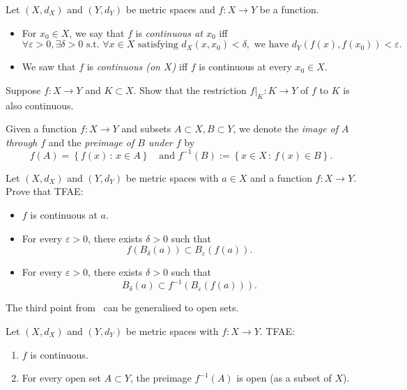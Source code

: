 \begin{defn}
\label{defn:cty}
Let $(X,d_X)$ and $(Y,d_Y)$ be metric spaces and $f:X\to Y$ be a function.
\begin{itemize}
	\item For $x_0\in X$, we say that $f$ is \textit{continuous at $x_0$} iff
	\[
	\forall \varepsilon>0,\exists \delta>0\text{ s.t. }\forall x\in X\text{ satisfying }d_X(x,x_0)<\delta,\text{ we have }d_Y(f(x),f(x_0))<\varepsilon.
	\]
	\item We saw that $f$ is \textit{continuous (on $X$)} iff $f$ is continuous at every $x_0\in X$.
\end{itemize}
\end{defn}
\begin{ex}
Suppose $f:X\to Y$ and $K\subset X$. Show that the restriction $f|_K:K\to Y$ of $f$ to $K$ is also continuous.
\end{ex}
\begin{defn}
	\label{defn:preimage}
	Given a function $f:X\to Y$ and subsets $A\subset X, B \subset Y$, we denote the \textit{image of $A$ through $f$} and the \textit{preimage of $B$ under $f$} by
	\[
	f(A) = \left\{
	f(x) \, : \, x \in A
	\right\}\quad\text{and }f^{-1}(B) := \left\{
	x\in X\, : \, f(x) \in B
	\right\}.
	\]
\end{defn}
\begin{ex}
	\label{ex:cts_image}
	Let $(X,d_X)$ and $(Y,d_Y)$ be metric spaces with $a\in X$ and a function $f:X\to Y$. Prove that TFAE:
	\begin{itemize}
		\item $f$ is continuous at $a$.
		\item For every $\varepsilon>0$, there exists $\delta>0$ such that
		\[
		f(B_\delta(a))\subset B_\varepsilon(f(a)).
		\]
		\item For every $\varepsilon>0$, there exists $\delta>0$ such that
		\[
		B_\delta(a) \subset f^{-1}(B_\varepsilon(f(a))).
		\]
	\end{itemize}
\end{ex}
The third point from~ can be generalised to open sets.
\begin{prop}
	\label{prop:cts_pre_open}
	Let $(X,d_X)$ and $(Y,d_Y)$ be metric spaces with $f:X\to Y$. TFAE:
	\begin{enumerate}
		\item $f$ is continuous.
		\item For every open set $A\subset Y$, the preimage $f^{-1}(A)$ is open (as a subset of $X$).
	\end{enumerate}
\end{prop}
